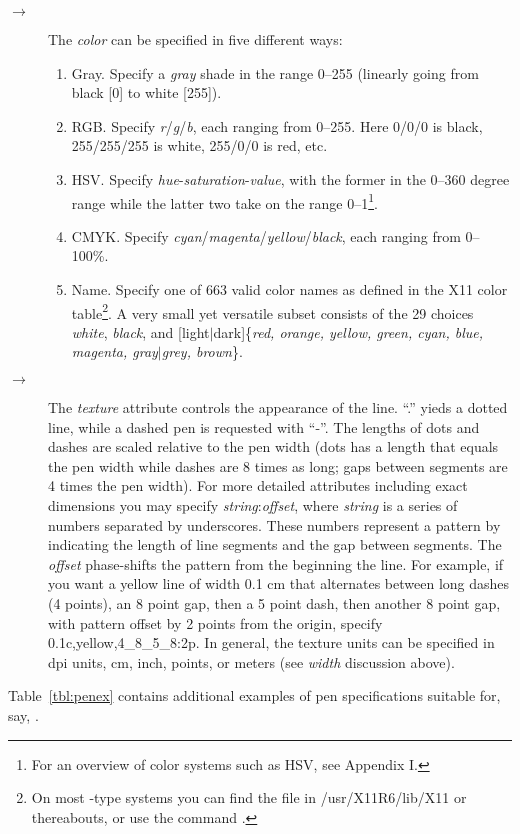 \begin{description}
%
\item[$\rightarrow$]The {\it color} can be specified in five different ways:
\begin{enumerate}
\item Gray. Specify a {\it gray} shade in the range 0--255 (linearly going from black [0] to white [255]).
\item RGB. Specify {\it r}/{\it g}/{\it b}, each ranging from 0--255.  Here 0/0/0 is black, 255/255/255 is white,
255/0/0 is red, etc.
\item HSV. Specify {\it hue}-{\it saturation}-{\it value}, with the former in the 0--360 degree range while the latter
two take on the range 0--1\footnote{For an overview of color systems such as HSV, see Appendix I.}.
\item CMYK. Specify {\it cyan}/{\it magenta}/{\it yellow}/{\it black}, each ranging from 0--100\%.
\item Name.  Specify one of 663 valid color names as defined in the X11 color table\footnote{On most \UNIX-type systems
you can find the file  in /usr/X11R6/lib/X11 or thereabouts, or use the command .}.
A very small yet versatile subset consists of the 29 choices {\it white}, {\it black}, and [light$|$dark]\{{\it red,
orange, yellow, green, cyan, blue, magenta, gray$|$grey, brown}\}.
\end{enumerate}

%
\item[$\rightarrow$]The {\it texture} attribute controls the appearance
of the line.  ``.'' yieds a dotted line, while a dashed pen is requested with ``-''.
The lengths of dots and dashes are scaled relative to the pen width (dots has
a length that equals the pen width while dashes are 8 times as long; gaps between
segments are 4 times the pen width).
For more detailed attributes including exact dimensions you may specify {\it string}:{\it offset},
where {\it string} is a series of numbers separated by underscores.
These numbers represent a pattern by indicating the length of line
segments and the gap between segments.  The {\it offset} phase-shifts the
pattern from the beginning the line.  For example, if you want a yellow line of width
0.1 cm that alternates between long dashes (4 points), an 8 point gap, then
a 5 point dash, then another 8 point gap, with pattern offset by 2 points
from the origin, specify 0.1c,yellow,4\_8\_5\_8:2p.
In general, the texture units can be specified in dpi units, cm, inch, points,
or meters (see \emph{width} discussion above). 
\end{description} 
Table~\ref{tbl:penex} contains additional examples of pen specifications suitable for, say, .

